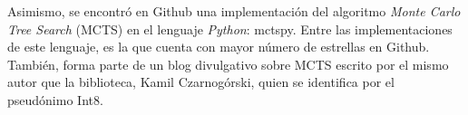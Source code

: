Asimismo, se encontró en Github una implementación del algoritmo \textit{Monte
Carlo Tree Search} (MCTS) en el lenguaje \textit{Python}: mctspy. Entre las
implementaciones de este lenguaje, es la que cuenta con mayor número de
estrellas en Github. También, forma parte de un blog divulgativo sobre MCTS
escrito por el mismo autor que la biblioteca, Kamil Czarnogórski, quien se
identifica por el pseudónimo Int8.






